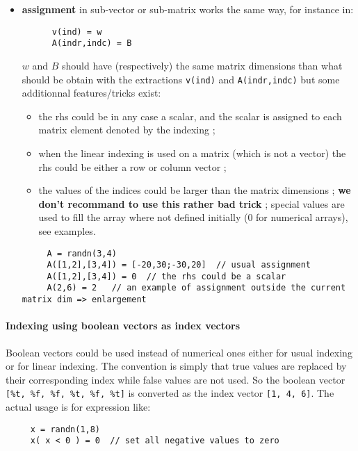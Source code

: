 \begin{itemize}
\begin{itemize}
     \end{itemize}

\item {\bf assignment} in sub-vector or sub-matrix works the same way, for instance in:
      \begin{Verbatim}
      v(ind) = w
      A(indr,indc) = B
      \end{Verbatim}
      $w$ and $B$ should have (respectively) the same matrix dimensions than what should be obtain with the extractions
      \verb+v(ind)+ and \verb+A(indr,indc)+ but some additionnal features/tricks exist:
      \begin{itemize}
      \item the rhs could be in any case a scalar, and the scalar is assigned to each matrix element denoted by the 
         indexing ;
      \item when the linear indexing is used on a matrix (which is not a vector) the rhs could be either a row
            or column vector ;
      \item the values of the indices could be larger than the matrix dimensions ; {\bf we don't recommand to use
            this rather bad trick} ; special values are used to fill the array where not defined initially 
            (0 for numerical arrays), see examples.
      \end{itemize}
     \begin{Verbatim}
     A = randn(3,4)
     A([1,2],[3,4]) = [-20,30;-30,20]  // usual assignment
     A([1,2],[3,4]) = 0  // the rhs could be a scalar
     A(2,6) = 2   // an example of assignment outside the current matrix dim => enlargement
     \end{Verbatim}
\end{itemize}

\paragraph{Indexing using boolean vectors as index vectors}  

Boolean vectors could be used instead
of numerical ones either for usual indexing or for linear indexing. The convention is simply
that true values are replaced by their corresponding index while false values are not used.
So the boolean vector \verb+[%t, %f, %f, %t, %f, %t]+ is converted as the index vector
\verb+[1, 4, 6]+. The actual usage is for expression like:
\begin{Verbatim}
     x = randn(1,8)
     x( x < 0 ) = 0  // set all negative values to zero
\end{Verbatim}
     

